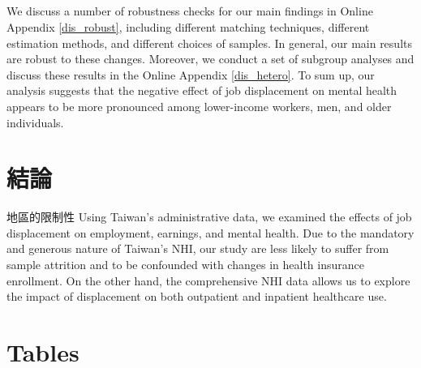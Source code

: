 \documentclass[12pt]{article}
\begin{document}




\subsection{}
We discuss a number of robustness checks for our main findings in Online Appendix \ref{dis_robust}, including different matching techniques, different estimation methods, and different choices of samples. In general, our main results are robust to these changes. Moreover, we conduct a set of subgroup analyses and discuss these results in the Online Appendix \ref{dis_hetero}. To sum up, our analysis suggests that the negative effect of job displacement on mental health appears to be more pronounced among lower-income workers, men, and older individuals.

\section{結論}\label{conclusion}

地區的限制性 Using Taiwan's administrative data, we examined the effects of job displacement on employment, earnings, and mental health. Due to the mandatory and generous nature of Taiwan's NHI, our study are less likely to suffer from sample attrition and to be confounded with changes in health insurance enrollment. On the other hand, the comprehensive NHI data allows us to explore the impact of displacement on both outpatient and inpatient healthcare use.



\newpage

{}




\newpage

\section*{Tables}
\end{document}
